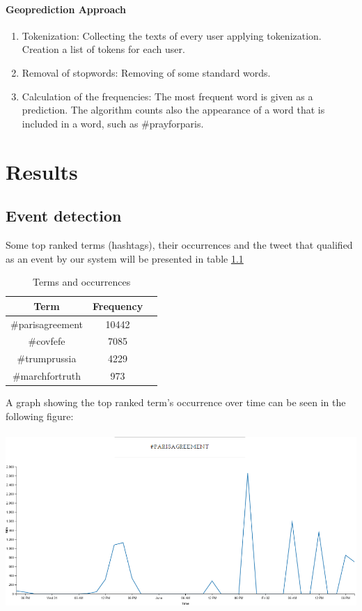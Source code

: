 \documentclass[12pt,svgnames]{report}
\begin{document}
\subsubsection*{Geoprediction Approach}
\begin{enumerate}
	\item Tokenization: Collecting the texts of every user applying tokenization. Creation a list of tokens for each user.
	\item Removal of stopwords: Removing of some standard words.
	\item Calculation of the frequencies: The most frequent word is given as a prediction. The algorithm counts also the appearance of a word that is included in a word, such as \#prayforparis.
\end{enumerate}

\chapter{Results}
\section*{Event detection}
Some top ranked terms (hashtags), their occurrences and the tweet that qualified as an event by our system will be presented in table \ref{tab:tftags}

\begin{table}[h!]
	\centering

	\begin{tabular}{ccc}
		\toprule
		Term & Frequency\\
		\midrule
		\#parisagreement & 10442\\
		\#covfefe & 7085\\
		\#trumprussia & 4229\\
		\#marchfortruth & 973\\
		\bottomrule
	\end{tabular}
	\caption{Terms and occurrences}
\label{tab:tftags}
\end{table}


A graph showing the top ranked term's occurrence over time can be seen in the following figure:\\
\\
\includegraphics[scale=0.63]{hashparisplot.png}
\\
\end{document}
